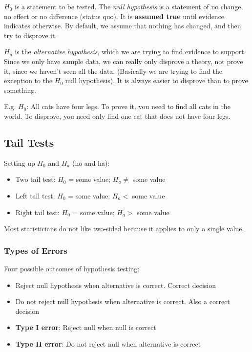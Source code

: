 \documentclass[11pt, oneside]{article}   	%
\begin{document}
$H_0$ is a statement to be tested. The \textit{null hypothesis} is a statement of no change, no effect or no difference (status quo). It is \textbf{assumed true} until evidence indicates otherwise. By default, we assume that nothing has changed, and then try to disprove it.

$H_a$ is the \textit{alternative hypothesis}, which we are trying to find evidence to support. Since we only have sample data, we can really only disprove a theory, not prove it, since we haven't seen all the data. (Basically we are trying to find the exception to the $H_0$ null hypothesis). It is always easier to disprove than to prove something.

E.g. $H_0$: All cats have four legs. To prove it, you need to find all cats in the world. To disprove, you need only find one cat that does not have four legs.

\subsection{Tail Tests}

Setting up $H_0$ and $H_a$ (ho and ha):
\begin{itemize}
\item{Two tail test: $H_0$ = some value; $H_a \neq$ some value}
\item{Left tail test:  $H_0$ = some value; $H_a <$ some value}
\item{Right tail test:  $H_0$ = some value; $H_a >$ some value}
\end{itemize}

Most statisticians do not like two-sided because it applies to only a single value. 

\subsubsection{Types of Errors}

Four possible outcomes of hypothesis testing:
\begin{itemize}
\item{Reject null hypothesis when alternative is correct. Correct decision}
\item{Do not reject null hypothesis when alternative is correct. Also a correct decision}
\item{\textbf{Type I error}: Reject null when null is correct}
\item{\textbf{Type II error}: Do not reject null when alternative is correct}
\end{itemize}
\end{document}
